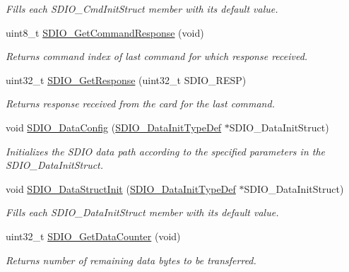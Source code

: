 \begin{DoxyCompactItemize}
\begin{DoxyCompactList}\small\item\em Fills each S\+D\+I\+O\+\_\+\+Cmd\+Init\+Struct member with its default value. \end{DoxyCompactList}\item 
uint8\+\_\+t \mbox{\hyperlink{group___s_d_i_o___private___functions_ga9badf271c818e09da301d715c4ad0e5b}{S\+D\+I\+O\+\_\+\+Get\+Command\+Response}} (void)
\begin{DoxyCompactList}\small\item\em Returns command index of last command for which response received. \end{DoxyCompactList}\item 
uint32\+\_\+t \mbox{\hyperlink{group___s_d_i_o___private___functions_ga5c1e859511840e8cca6a9a768bce220b}{S\+D\+I\+O\+\_\+\+Get\+Response}} (uint32\+\_\+t S\+D\+I\+O\+\_\+\+R\+E\+SP)
\begin{DoxyCompactList}\small\item\em Returns response received from the card for the last command. \end{DoxyCompactList}\item 
void \mbox{\hyperlink{group___s_d_i_o___private___functions_gad65d896ae919683585bda44a1e2afae4}{S\+D\+I\+O\+\_\+\+Data\+Config}} (\mbox{\hyperlink{struct_s_d_i_o___data_init_type_def}{S\+D\+I\+O\+\_\+\+Data\+Init\+Type\+Def}} $\ast$S\+D\+I\+O\+\_\+\+Data\+Init\+Struct)
\begin{DoxyCompactList}\small\item\em Initializes the S\+D\+IO data path according to the specified parameters in the S\+D\+I\+O\+\_\+\+Data\+Init\+Struct. \end{DoxyCompactList}\item 
void \mbox{\hyperlink{group___s_d_i_o___private___functions_gaa83209c09e921521aca2587fb5b22ea2}{S\+D\+I\+O\+\_\+\+Data\+Struct\+Init}} (\mbox{\hyperlink{struct_s_d_i_o___data_init_type_def}{S\+D\+I\+O\+\_\+\+Data\+Init\+Type\+Def}} $\ast$S\+D\+I\+O\+\_\+\+Data\+Init\+Struct)
\begin{DoxyCompactList}\small\item\em Fills each S\+D\+I\+O\+\_\+\+Data\+Init\+Struct member with its default value. \end{DoxyCompactList}\item 
uint32\+\_\+t \mbox{\hyperlink{group___s_d_i_o___private___functions_ga7a28aaa2c25a9a5a8db1f49b0e8c9d0a}{S\+D\+I\+O\+\_\+\+Get\+Data\+Counter}} (void)
\begin{DoxyCompactList}\small\item\em Returns number of remaining data bytes to be transferred. \end{DoxyCompactList}\item 

\end{DoxyCompactItemize}
